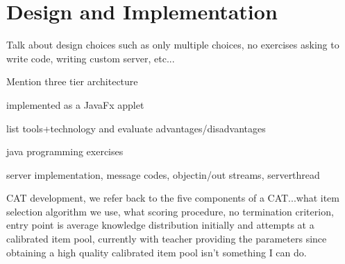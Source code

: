 \chapter{Design and Implementation}
\label{chap:implementation}
Talk about design choices such as only multiple choices, no exercises asking to write code, writing custom server, etc...

Mention three tier architecture

implemented as a JavaFx applet

list tools+technology and evaluate advantages/disadvantages

java programming exercises

server implementation, message codes, objectin/out streams, serverthread


CAT development, we refer back to the five components of a CAT...what item selection algorithm we use, what scoring procedure, no termination criterion, entry point is average knowledge distribution initially and attempts at a calibrated item pool, currently with teacher providing the parameters since obtaining a high quality calibrated item pool isn't something I can do.
\newpage



\newpage

